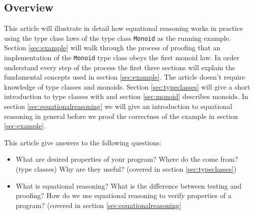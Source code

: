 \subsection{Overview}

This article will illustrate in detail how equational reasoning works in practice using the type class laws of the type class \verb|Monoid| as the running example. Section \ref{sec:example} will walk through the process of proofing that an implementation of the \verb|Monoid| type class obeys the first monoid law.  In order understand every step of the process the first three sections will explain the fundamental concepts used in section \ref{sec:example}. The article doesn't require knowledge of type classes and monoids. 
Section \ref{sec:typeclasses} will give a short introduction to type classes with and section \ref{sec:monoid} describes monoids. In section \ref{sec:equationalreasoning} we will give an introduction to equational reasoning in general before we proof the correctnes of the example in section \ref{sec:example}.

This article give answers to the following questions:
\begin{itemize}
\item What are desired properties of your program? Where do the come from? (type classes) Why are they useful? (covered in section \ref{sec:typeclasses})
\item What is equational reasoning? What is the difference between testing and proofing? How do we use equational reasoning to verify properties of a program? (covered in section \ref{sec:equationalreasoning}
\end{itemize}

